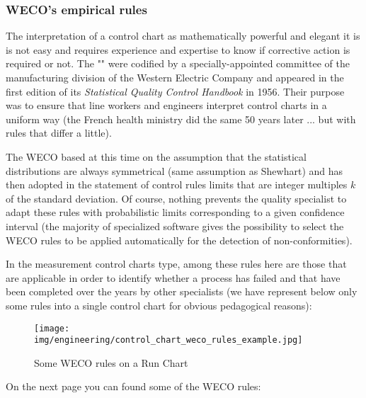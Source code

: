 	\pagebreak
	\subsubsection{WECO's empirical rules}
	The interpretation of a control chart as mathematically  powerful and elegant it is is not easy and requires experience and expertise to know if corrective action is required or not.  The "" were codified by a specially-appointed committee of the manufacturing division of the Western Electric Company and appeared in the first edition of its \textit{Statistical Quality Control Handbook} in 1956. Their purpose was to ensure that line workers and engineers interpret control charts in a uniform way (the French health ministry did the same 50 years later ... but with rules that differ a little).

	The WECO based at this time on the assumption that the statistical distributions are always symmetrical (same assumption as Shewhart) and has then adopted in the statement of control  rules limits that are integer multiples $k$ of the standard deviation. Of course, nothing prevents the quality specialist to adapt these rules with probabilistic limits corresponding to a given confidence interval (the majority of specialized software gives the possibility to select the WECO rules to be applied automatically for the detection of non-conformities).

	In the measurement control charts type, among these rules here are those that are applicable in order to identify whether a process has failed and that have been completed over the years by other specialists (we have represent below only some  rules into a single control chart for obvious pedagogical reasons):
	\begin{figure}[H]
		\centering
		\texttt{[image: img/engineering/control\_chart\_weco\_rules\_example.jpg]}
		\caption[]{Some WECO rules on a Run Chart}
	\end{figure}
	On the next page you can found some of the WECO rules:
	
